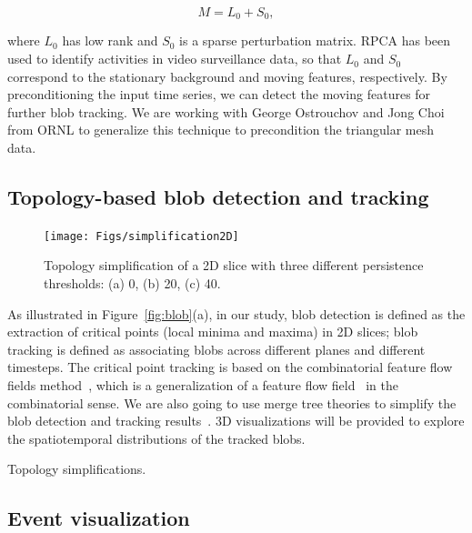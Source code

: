 \begin{equation}
M = L_0 + S_0, 
\end{equation}

\noindent where $L_0$ has low rank and $S_0$ is a sparse perturbation matrix.  RPCA has been used to identify activities in video surveillance data, so that $L_0$ and $S_0$ correspond to the stationary background and moving features, respectively.  By preconditioning the input time series, we can detect the moving features for further blob tracking.  We are working with George Ostrouchov and Jong Choi from ORNL to generalize this technique to precondition the triangular mesh data.  


\subsection{Topology-based blob detection and tracking}


\begin{figure}[!h]
  \centering
  \texttt{[image: Figs/simplification2D]}
  \caption{Topology simplification of a 2D slice with three different persistence thresholds: (a) 0, (b) 20, (c) 40.}
\end{figure}


As illustrated in Figure~\ref{fig:blob}(a), in our study, blob detection is defined as the extraction of critical points (local minima and maxima) in 2D slices; blob tracking is defined as associating blobs across different planes and different timesteps.  The critical point tracking is based on the combinatorial feature flow fields method~\cite{ReininghausKWH12}, which is a generalization of a feature flow field~\cite{TheiselS03} in the combinatorial sense.  We are also going to use merge tree theories to simplify the blob detection and tracking results~\cite{OesterlingHWMS17}.  3D visualizations will be provided to explore the spatiotemporal distributions of the tracked blobs.  

Topology simplifications.  




\subsection{Event visualization}

